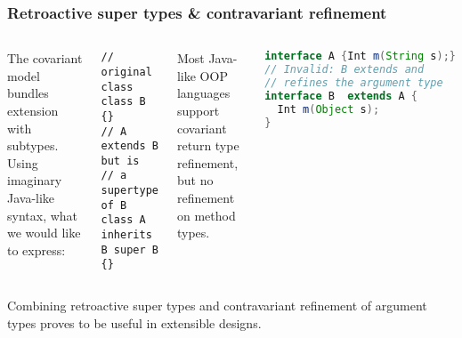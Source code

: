 \documentclass{beamer}
\begin{document}
\begin{frame}[fragile]
  \frametitle{Retroactive super types \& contravariant refinement}

\begin{columns}[t]

The covariant model bundles extension with subtypes. Using imaginary Java-like
syntax, what we would like to express:

\begin{exampleblock}{}
\begin{lstlisting}
// original class
class B {}
// A extends B but is
// a supertype of B
class A inherits B super B {}
\end{lstlisting}

\end{exampleblock}


\pause


Most Java-like OOP languages support covariant return type refinement, but no
refinement on method types.

\begin{exampleblock}{}
\begin{lstlisting}[language=java]
interface A {Int m(String s);}
// Invalid: B extends and
// refines the argument type
interface B  extends A {
  Int m(Object s);
}
\end{lstlisting}
\end{exampleblock}



\end{columns}

\pause

\vskip10pt


Combining retroactive super types and contravariant refinement of argument types
proves to be useful in extensible designs.

\end{frame}
\end{document}
